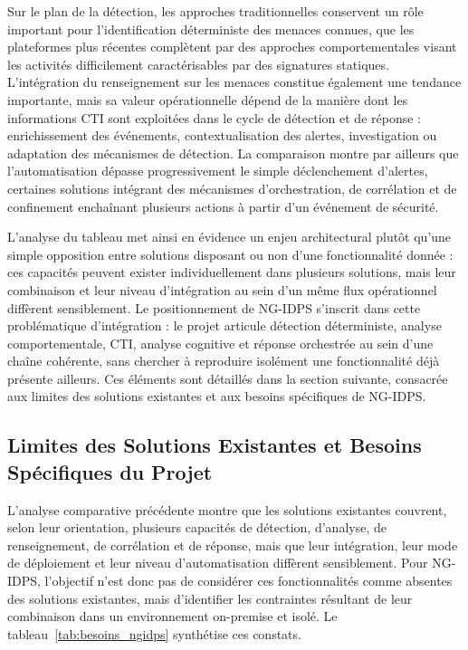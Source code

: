Sur le plan de la détection, les approches traditionnelles conservent un rôle important pour
l'identification déterministe des menaces connues, que les plateformes plus récentes complètent
par des approches comportementales visant les activités difficilement caractérisables par des
signatures statiques. L'intégration du renseignement sur les menaces constitue également une
tendance importante, mais sa valeur opérationnelle dépend de la manière dont les informations
CTI sont exploitées dans le cycle de détection et de réponse : enrichissement des événements,
contextualisation des alertes, investigation ou adaptation des mécanismes de détection. La
comparaison montre par ailleurs que l'automatisation dépasse progressivement le simple
déclenchement d'alertes, certaines solutions intégrant des mécanismes d'orchestration, de
corrélation et de confinement enchaînant plusieurs actions à partir d'un événement de sécurité.

L'analyse du tableau met ainsi en évidence un enjeu architectural plutôt qu'une simple opposition
entre solutions disposant ou non d'une fonctionnalité donnée : ces capacités peuvent exister
individuellement dans plusieurs solutions, mais leur combinaison et leur niveau d'intégration au
sein d'un même flux opérationnel diffèrent sensiblement. Le positionnement de NG-IDPS s'inscrit
dans cette problématique d'intégration : le projet articule détection déterministe, analyse
comportementale, CTI, analyse cognitive et réponse orchestrée au sein d'une chaîne cohérente,
sans chercher à reproduire isolément une fonctionnalité déjà présente ailleurs. Ces éléments sont
détaillés dans la section suivante, consacrée aux limites des solutions existantes et aux besoins
spécifiques de NG-IDPS.



\subsection{Limites des Solutions Existantes et Besoins Spécifiques du Projet}

L'analyse comparative précédente montre que les solutions existantes couvrent, selon leur orientation, plusieurs capacités de détection, d'analyse, de renseignement, de corrélation et de réponse, mais que leur intégration, leur mode de déploiement et leur niveau d'automatisation diffèrent sensiblement. Pour NG-IDPS, l'objectif n'est donc pas de considérer ces fonctionnalités comme absentes des solutions existantes, mais d'identifier les contraintes résultant de leur combinaison dans un environnement on-premise et isolé. Le tableau~\ref{tab:besoins_ngidps} synthétise ces constats.

